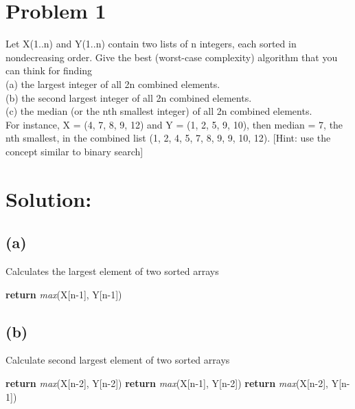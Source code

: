 	\newdimen\boxitspace\boxitspace=3pt%
	\long\def\boxit#1{\vbox{\hrule\hbox{\vrule\kern\boxitspace\vbox{%
					\kern\boxitspace\parindent0pt#1\kern\boxitspace}%
				\kern\boxitspace\vrule}\hrule}}
	\def\aryitem#1{\boxit{\hbox to 1.4em{\hfil#1\hfil}}}%
	\let\MS\multispan%

    \section*{Problem 1}
    \noindent
    Let X(1..n) and Y(1..n) contain two lists of n integers, each sorted in nondecreasing order. Give the best (worst-case complexity) algorithm that you can think for finding \\
    (a) the largest integer of all 2n combined elements.\\
    (b) the second largest integer of all 2n combined elements.\\
    (c) the median (or the nth smallest integer) of all 2n combined elements.\\
    For instance, X = (4, 7, 8, 9, 12) and Y = (1, 2, 5, 9, 10), then median = 7, the nth smallest, in the combined list (1, 2, 4, 5, 7, 8, 9, 9, 10, 12). [Hint: use the concept similar to binary search]

    \section*{Solution:}
    	\subsection*{(a)}
  				\begin{algorithm}[H]
  					\caption{Calculates the largest element of two sorted arrays}
  					\begin{algorithmic}[1]
  						\State \textbf{return} \textit{max}(X[n-1], Y[n-1])
  						\EndProcedure
  					\end{algorithmic}
  				\end{algorithm}
  		\subsection*{(b)}
  			\begin{algorithm}[H]
  				\caption{Calculate second largest element of two sorted arrays}
  				\begin{algorithmic}[1]
  					\State\textbf{return} \textit{max}(X[n-2], Y[n-2])
  					\State\textbf{return} \textit{max}(X[n-1], Y[n-2])
  					\Else
  					\State\textbf{return} \textit{max}(X[n-2], Y[n-1])
  					\EndIf
  					\EndProcedure
  				\end{algorithmic}
  			\end{algorithm}	
